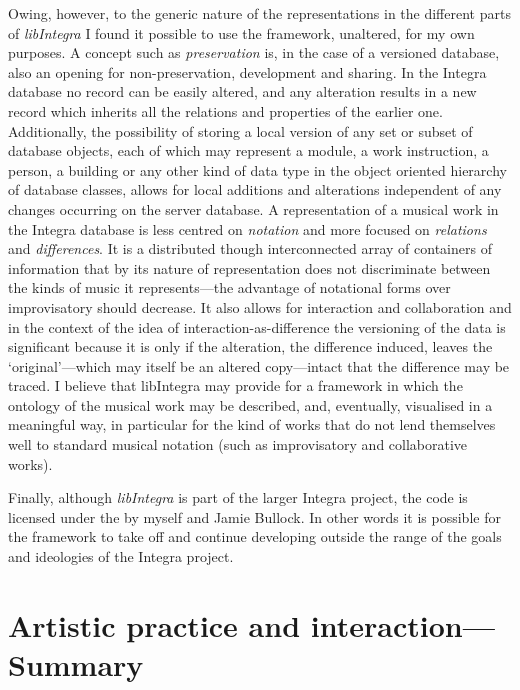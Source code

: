 Owing, however, to the generic nature of the representations in the different parts of \emph{libIntegra} I found it possible to use the framework, unaltered, for my own purposes. A concept such as \emph{preservation} is, in the case of a versioned database, also an opening for non-preservation, development and sharing. In the Integra database no record can be easily altered, and any alteration results in a new record which inherits all the relations and properties of the earlier one. Additionally, the possibility of storing a local version of any set or subset of database objects, each of which may represent a  module, a work instruction, a person, a building or any other kind of data type in the object oriented hierarchy of database classes, allows for local additions and alterations independent of any changes occurring on the server database. A representation of a musical work in the Integra database is less centred on \emph{notation} and more focused on \emph{relations} and \emph{differences}. It is a distributed though interconnected array of containers of information that by its nature of representation does not discriminate between the kinds of music it represents---the advantage of notational forms over improvisatory should decrease. It also allows for interaction and collaboration and in the context of the idea of interaction-as-difference the versioning of the data is significant because it is only if the alteration, the difference induced, leaves the `original'---which may itself be an altered copy---intact that the difference may be traced. I believe that libIntegra may provide for a framework in which the ontology of the musical work may be described, and, eventually, visualised in a meaningful way, in particular for the kind of works that do not lend themselves well to standard musical notation (such as improvisatory and collaborative works).

Finally, although \emph{libIntegra} is part of the larger Integra project, the code is licensed under the  by myself and Jamie Bullock. In other words it is possible for the framework to take off and continue developing outside the range of the goals and ideologies of the Integra project.

\section{Artistic practice and interaction---Summary}
\label{sec:music-pract-inter}

